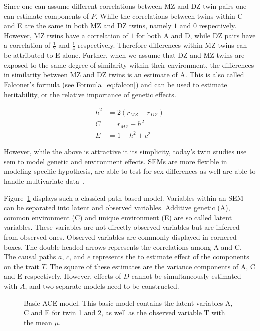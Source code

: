 Since one can assume different correlations between MZ and DZ twin pairs one can estimate components of $P$.
While the correlations between twins within C and E are the same in both MZ and DZ twins, namely $1$ and $0$ respectively.
However, MZ twins have a correlation of $1$ for both A and D, while DZ pairs have a correlation of $\frac{1}{2}$ and $\frac{1}{4}$ respectively.
Therefore differences within MZ twins can be attributed to E alone.
Further, when we assume that DZ and MZ twins are exposed to the same degree of similarity within their environment, the differences in similarity between MZ and DZ twins is an estimate of A.
This is also called Falconer's formula (see Formula~\ref{eq:falcon}) and can be used to estimate heritability, or the relative importance of genetic effects.

\begin{align}
  h^2 &= 2(r_{MZ}-r_{DZ})\label{eq:falcon} \\ 
  C &= r_{MZ} - h^2  \\
  E &= 1 - h^2 + c^2  
\end{align}

However, while the above is attractive it its simplicity, today's twin studies use \acrfull{sem} to model genetic and environment effects.
SEMs are more flexible in modeling specific hypothesis, are able to test for sex differences as well are able to handle multivariate data~\cite{Rijsdijk2002}.

Figure~\ref{fig:ace} displays such a classical path based model.
Variables within an SEM can be separated into latent and observed variables.
Additive genetic (A), common environment (C) and unique environment (E) are so called latent variables.
These variables are not directly observed variables but are inferred from observed ones.
Observed variables are commonly displayed in cornered boxes.
The double headed arrows represents the correlations among A and C.
The causal paths $a$, $c$, and $e$ represents the to estimate effect of the components on the trait $T$.
The square of these estimates are the variance components of A, C and E respectively.
However, effects of $D$ cannot be simultaneously estimated with $A$, and two separate models need to be constructed.

\begin{figure}[htpb]
  \centering
  \scalebox{0.6}{}
  \caption{
    Basic ACE model.
    This basic model contains the latent variables A, C and E for twin 1 and 2, as well as the observed variable T with the mean $\mu$.
  }\label{fig:ace}
\end{figure}

